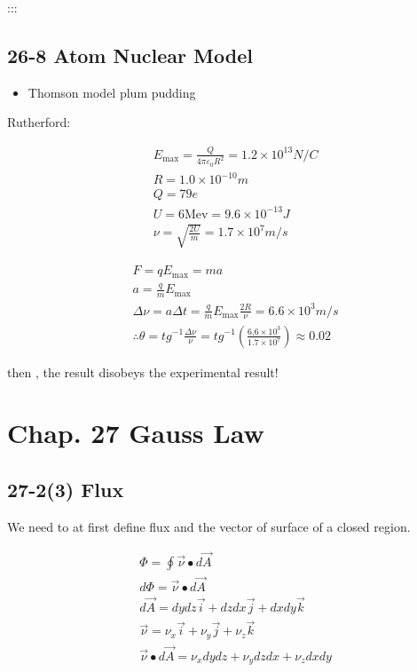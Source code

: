\documentclass[
]{article}
\providecommand{\tightlist}{%
  \setlength{\itemsep}{0pt}\setlength{\parskip}{0pt}}
\begin{document}
:::

\hypertarget{atom-nuclear-model}{%
\subsection{26-8 Atom Nuclear Model}\label{atom-nuclear-model}}

\begin{itemize}
\tightlist
\item
  Thomson model plum pudding
\end{itemize}

Rutherford:

\[
\begin{aligned}
&E_{\max}=\frac{Q}{4\pi\varepsilon_{0}R^{2}}=1.2\times10^{13}N/C \\
&R=1.0\times10^{-10}m \\
&Q=79e \\
&U=6\mathrm{Mev}=9.6\times10^{-13}J \\
&\nu=\sqrt{\frac{2U}{m}}=1.7\times10^{7}m/s
\end{aligned}
\]

\[
\begin{aligned}
&F=qE_{\max}=ma \\
&a=\frac{q}{m}E_{\max} \\
&\Delta\nu=a\Delta t=\frac{q}{m}E_{\max}\frac{2R}{\nu}=6.6\times10^{3}m/s \\
&\therefore\theta=tg^{-1}\frac{\Delta\nu}{\nu}=tg^{-1}(\frac{6.6\times10^{3}}{1.7\times10^{7}})\approx0.02
\end{aligned}
\]

then , the result disobeys the experimental result!

\hypertarget{chap.-27-gauss-law}{%
\section{Chap. 27 Gauss Law}\label{chap.-27-gauss-law}}

\hypertarget{flux}{%
\subsection{27-2(3) Flux}\label{flux}}

We need to at first define flux and the vector of surface of a closed
region.

\[
\begin{aligned}
&\Phi=\oint\vec{\nu}\bullet d\vec{A} \\
&d\Phi=\vec{\nu}\bullet d\vec{A} \\
&d\vec{A}=dydz\vec{i}+dzdx\vec{j}+dxdy\vec{k} \\
&\vec{\nu}=\nu_{x}\vec{i}+\nu_{y}\vec{j}+\nu_{z}\vec{k} \\
&\vec{\nu}•d\vec{A}=\nu_{x}dydz+\nu_{y}dzdx+\nu_{z}dxdy
\end{aligned}
\]
\end{document}
